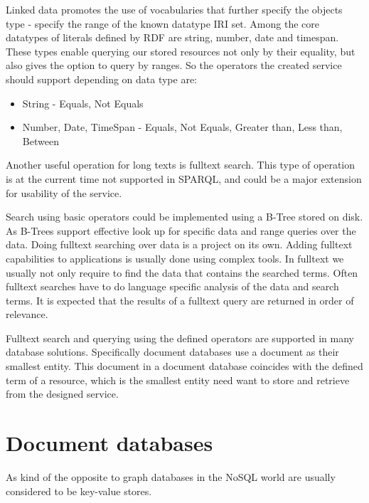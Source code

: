 Linked data promotes the use of vocabularies %
that further specify the objects type - specify the range of the known datatype IRI set.
Among the core datatypes of literals defined by RDF are string, number, date and timespan. These types enable querying our stored resources not only by their equality, but also gives the option to query by ranges. So the operators the created service should support depending on data type are:
\begin{itemize}
	\item String - Equals, Not Equals
	\item Number, Date, TimeSpan - Equals, Not Equals, Greater than, Less than, Between
\end{itemize}
Another useful operation for long texts is fulltext search. %
This type of operation is at the current time not supported in SPARQL, and could be a major extension for usability of the service.

Search using basic operators could be implemented using a B-Tree stored on disk. As B-Trees support effective look up for specific data and range queries over the data.
Doing fulltext searching over data is a project on its own. Adding fulltext capabilities to applications is usually done using complex tools. In fulltext we usually not only require to find the data that contains the searched terms. Often fulltext searches have to do language specific analysis of the data and search terms. It is expected that the results of a fulltext query are returned in order of relevance.

Fulltext search and querying using the defined operators are supported in many database solutions. Specifically document databases use a document as their smallest entity. This document in a document database coincides with the defined term of a resource, which is the smallest entity need want to store and retrieve from the designed service.

\section{Document databases}
As kind of the opposite to graph databases in the NoSQL world are usually considered to be key-value stores. 

